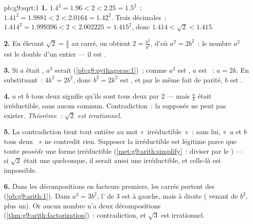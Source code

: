 \begin{solution}{pb:g9:sqrt:1}
\textbf{1.} $1.4^2 = 1.96 < 2 < 2.25 = 1.5^2$~;
$1.41^2 = 1.9881 < 2 < 2.0164 = 1.42^2$. Trois décimales~:
$1.414^2 = 1.999396 < 2 < 2.002225 = 1.415^2$, donc
$1.414 < \sqrt2 < 1.415$.

\textbf{2.} En élevant $\sqrt2 = \frac ab$ au carré, on obtient
$2 = \frac{a^2}{b^2}$, d'où $a^2 = 2b^2$~: le nombre $a^2$ est le
double d'un entier --- il est \emph{}.

\textbf{3.} Si $a$ était , $a^2$ serait 
(\cref{pb:g8:pythagoras:1})~; comme $a^2$ est , $a$ est ~:
$a = 2k$. En substituant~: $4k^2 = 2b^2$, donc $b^2 = 2k^2$ est
, et par le même fait de parité, $b$ est .

\textbf{4.} $a$ et $b$ tous deux  signifie qu'ils sont tous
deux  par $2$ --- mais $\frac ab$ était irréductible, sans
aucun  commun. Contradiction~: la  supposée ne peut
pas exister. \emph{Théorème~: $\sqrt2$ est irrationnel.}

\textbf{5.} La contradiction tient tout entière au mot
«~irréductible~»~: sans lui, «~$a$ et $b$ tous deux ~» ne
contredit rien. Supposer la  irréductible est légitime parce
que toute  \emph{possède} une forme irréductible
(\cref{met:g9:arith:simplify}~: diviser par le ) --- si $\sqrt2$
était une  quelconque, il serait aussi une 
irréductible, et celle-là est impossible.

\textbf{6.} Dans les décompositions en facteurs premiers, les carrés
portent des   (\cref{pb:g9:arith:1}). Dans
$a^2 = 3b^2$, l' de $3$ est  à gauche, mais  à
droite ( venant de $b^2$, plus un). Or aucun nombre n'a deux
décompositions (\cref{thm:g9:arith:factorization})~: contradiction,
et $\sqrt3$ est irrationnel.


\end{solution}
